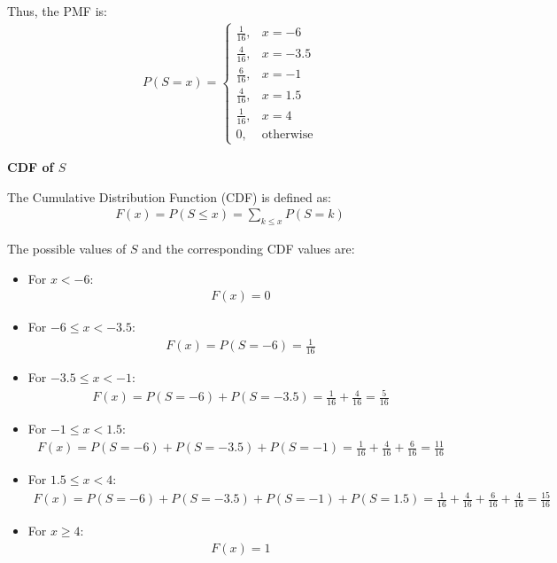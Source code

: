 \documentclass[journal]{IEEEtran}
\numberwithin{equation}{enumi}
\numberwithin{figure}{enumi}
\begin{document}
Thus, the PMF is:
\begin{align}
P(S = x) =
\begin{cases}
\frac{1}{16}, & x = -6 \\
\frac{4}{16}, & x = -3.5 \\
\frac{6}{16}, & x = -1 \\
\frac{4}{16}, & x = 1.5 \\
\frac{1}{16}, & x = 4 \\
0, & \text{otherwise}
\end{cases}
\end{align}



\textbf{CDF of $S$}

The Cumulative Distribution Function (CDF) is defined as:
\begin{align}
F(x) = P(S \leq x) = \sum_{k \leq x} P(S = k)
\end{align}

The possible values of $S$ and the corresponding CDF values are:
\begin{itemize}
    \item For $x < -6$:
    \begin{align}
    F(x) = 0
    \end{align}
    \item For \(-6 \leq x < -3.5\):
    \begin{align}
    F(x) = P(S = -6) = \frac{1}{16}
    \end{align}
    \item For \(-3.5 \leq x < -1\):
    \begin{align}
    F(x) = P(S = -6) + P(S = -3.5) = \frac{1}{16} + \frac{4}{16} = \frac{5}{16}
    \end{align}
    \item For \(-1 \leq x < 1.5\):
    \begin{align}
    F(x) = P(S = -6) + P(S = -3.5) + P(S = -1) = \frac{1}{16} + \frac{4}{16} + \frac{6}{16} = \frac{11}{16}
    \end{align}
    \item For \(1.5 \leq x < 4\):
    \begin{align}
    F(x) = P(S = -6) + P(S = -3.5) + P(S = -1) + P(S = 1.5) = \frac{1}{16} + \frac{4}{16} + \frac{6}{16} + \frac{4}{16} = \frac{15}{16}
    \end{align}
    \item For \(x \geq 4\):
    \begin{align}
    F(x) = 1
    \end{align}
\end{itemize}
\end{document}
